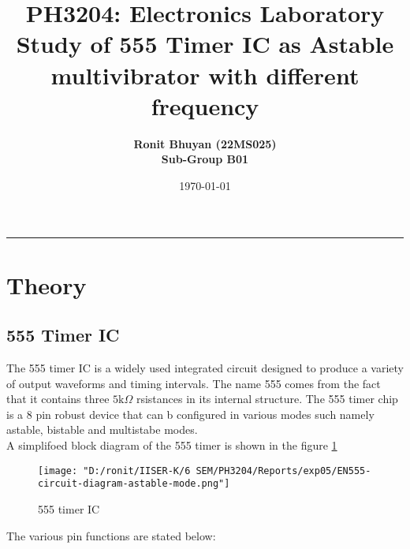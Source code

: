 \documentclass[12pt]{article}
\title{
  \vspace{-2cm}
  \Huge \textbf{PH3204: Electronics Laboratory} \\[0.4cm]
  \Large \textbf{ Study of 555 Timer IC as Astable multivibrator with different frequency}
}
\author{
  \textbf{Ronit Bhuyan (22MS025)} \\[0.2cm]
  \textbf{Sub-Group B01}
}
\date{\today}
\begin{document}
\maketitle

\tableofcontents
\noindent\rule{\textwidth}{0.4pt}
\newpage

\section{Theory}
\subsection{555 Timer IC}
The 555 timer IC is a widely used integrated circuit designed to produce a variety of output waveforms and timing intervals. The name 555 comes from the fact that it contains three $5 \mathrm{k}\Omega$ rsistances in its internal structure. The 555 timer chip is a 8 pin robust device that can b configured in various modes such namely astable, bistable and multistabe modes. \\
A simplifoed block diagram of the 555 timer is shown in the figure \ref{fig:555_timer}
\begin{figure}[H]
   \centering
    \texttt{[image: "D:/ronit/IISER-K/6 SEM/PH3204/Reports/exp05/EN555-circuit-diagram-astable-mode.png"]}
    \caption{555 timer IC}
    \label{fig:555_timer}
\end{figure}
\noindent
The various pin functions are stated below:
\end{document}
